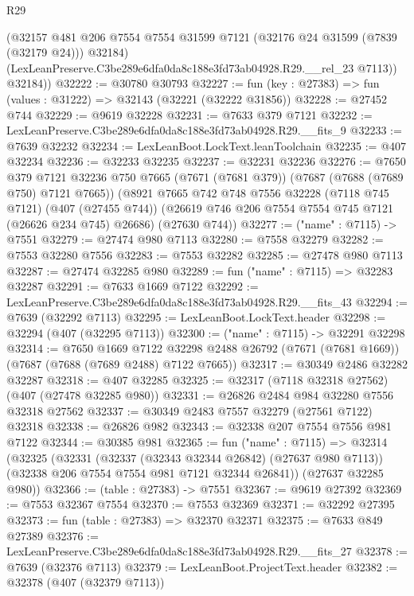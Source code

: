 \begin{lexlean}{R29}
\begin{coremodule}
          (@32157
            @481
            @206
            @7554
            @7554
            @31599
            @7121
            (@32176 @24 @31599 (@7839 (@32179 @24)))
            @32184)
          (LexLeanPreserve.C3be289e6dfa0da8c188e3fd73ab04928.R29.__rel_23 @7113))
        @32184))
@32222 := @30780 @30793
@32227 := fun (key : @27383) => fun (values : @31222) => @32143 (@32221 (@32222 @31856))
@32228 := @27452 @744
@32229 := @9619 @32228
@32231 := @7633 @379 @7121
@32232 := LexLeanPreserve.C3be289e6dfa0da8c188e3fd73ab04928.R29.__fits_9
@32233 := @7639 @32232
@32234 := LexLeanBoot.LockText.leanToolchain
@32235 := @407 @32234
@32236 := @32233 @32235
@32237 := @32231 @32236
@32276 := @7650
    @379
    @7121
    @32236
    @750
    @7665
    (@7671 (@7681 @379))
    (@7687 (@7688 (@7689 @750) @7121 @7665))
    (@8921
      @7665
      @742
      @748
      @7556
      @32228
      (@7118 @745 @7121)
      (@407 (@27455 @744))
      (@26619 @746 @206 @7554 @7554 @745 @7121 (@26626 @234 @745) @26686)
      (@27630 @744))
@32277 := ("name" : @7115) -> @7551
@32279 := @27474 @980 @7113
@32280 := @7558 @32279
@32282 := @7553 @32280 @7556
@32283 := @7553 @32282
@32285 := @27478 @980 @7113
@32287 := @27474 @32285 @980
@32289 := fun ("name" : @7115) => @32283 @32287
@32291 := @7633 @1669 @7122
@32292 := LexLeanPreserve.C3be289e6dfa0da8c188e3fd73ab04928.R29.__fits_43
@32294 := @7639 (@32292 @7113)
@32295 := LexLeanBoot.LockText.header
@32298 := @32294 (@407 (@32295 @7113))
@32300 := ("name" : @7115) -> @32291 @32298
@32314 := @7650
    @1669
    @7122
    @32298
    @2488
    @26792
    (@7671 (@7681 @1669))
    (@7687 (@7688 (@7689 @2488) @7122 @7665))
@32317 := @30349 @2486 @32282 @32287
@32318 := @407 @32285
@32325 := @32317 (@7118 @32318 @27562) (@407 (@27478 @32285 @980))
@32331 := @26826 @2484 @984 @32280 @7556 @32318 @27562
@32337 := @30349 @2483 @7557 @32279 (@27561 @7122) @32318
@32338 := @26826 @982
@32343 := @32338 @207 @7554 @7556 @981 @7122
@32344 := @30385 @981
@32365 := fun ("name" : @7115) =>
  @32314
    (@32325
      (@32331
        (@32337 (@32343 @32344 @26842) (@27637 @980 @7113))
        (@32338 @206 @7554 @7554 @981 @7121 @32344 @26841))
      (@27637 @32285 @980))
@32366 := (table : @27383) -> @7551
@32367 := @9619 @27392
@32369 := @7553 @32367 @7554
@32370 := @7553 @32369
@32371 := @32292 @27395
@32373 := fun (table : @27383) => @32370 @32371
@32375 := @7633 @849 @27389
@32376 := LexLeanPreserve.C3be289e6dfa0da8c188e3fd73ab04928.R29.__fits_27
@32378 := @7639 (@32376 @7113)
@32379 := LexLeanBoot.ProjectText.header
@32382 := @32378 (@407 (@32379 @7113))

\end{coremodule}
\end{lexlean}
